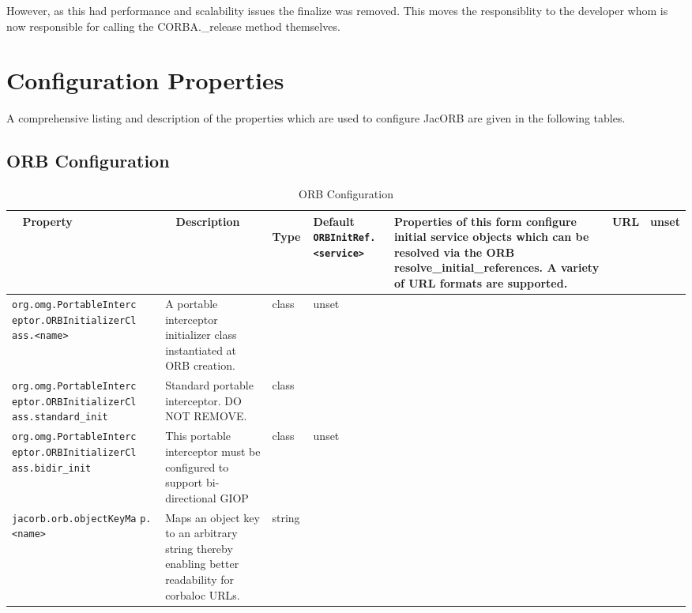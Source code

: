 However, as this had performance and scalability issues the finalize was
removed. This moves the responsiblity to the developer whom is now responsible
for calling the CORBA.\_release method themselves.

\section{Configuration Properties}

A comprehensive listing and description of the properties which are used
to configure JacORB are given in the following tables.

\subsection{ORB Configuration}
\begin{small}
\begin{longtable}{|p{5cm}|p{7.5cm}|p{1.5cm}|p{1.5cm}|}
\caption{ORB Configuration}\\
\hline
~ \hfill \textbf {Property} \hfill ~ & ~ \hfill \textbf {Description}
\hfill ~ & ~ \hfill \textbf {Type} \hfill ~ & \hfill \textbf{Default} \endhead
\hline
\verb"ORBInitRef.<service>" & Properties of this form configure
initial service objects which can be resolved via the ORB
resolve\_initial\_references. A variety of URL formats are
supported. & URL & unset \\
\hline
\verb"org.omg.PortableInterc"
\verb"eptor.ORBInitializerCl"
\verb"ass.<name>" & A portable interceptor initializer class
instantiated at ORB creation. & class & unset \\
\hline
\verb"org.omg.PortableInterc"
\verb"eptor.ORBInitializerCl"
\verb"ass.standard_init" & Standard portable interceptor. DO NOT
REMOVE. & class &  \\
\hline
\verb"org.omg.PortableInterc"
\verb"eptor.ORBInitializerCl"
\verb"ass.bidir_init" & This portable interceptor must be configured
to support bi-directional GIOP & class & unset \\
\hline
\verb"jacorb.orb.objectKeyMa"
\verb"p.<name>" & Maps an object key to an arbitrary string thereby
enabling better readability for corbaloc URLs. & string & \\
\hline


\end{longtable}
\end{small}
